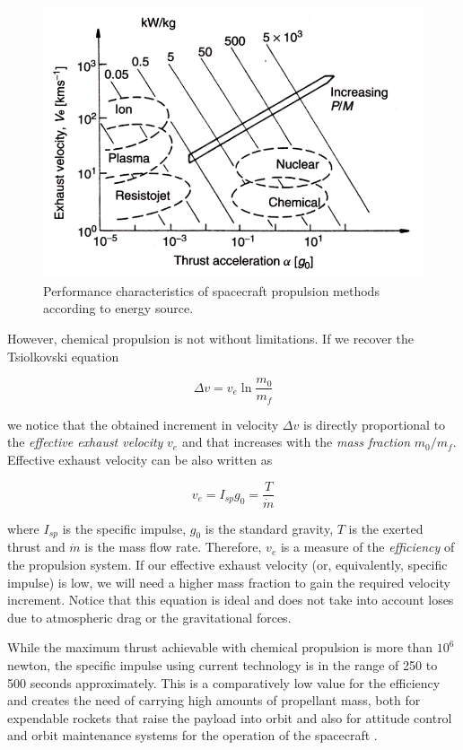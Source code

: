 \begin{figure}
\centering
\includegraphics[width=1.0\textwidth]{figures/propulsion-diagram.png}
\caption{Performance characteristics of spacecraft propulsion methods according to energy source.}
\label{fig:propulsionchart}
\end{figure}

However, chemical propulsion is not without limitations. If we recover the Tsiolkovski equation

\begin{equation}
\Delta v = v_e \ln \frac{m_0}{m_f}
\end{equation}

we notice that the obtained increment in velocity $\Delta v$ is directly proportional to the \textit{effective exhaust velocity} $v_e$ and that increases with the \textit{mass fraction} $m_0 / m_f$. Effective exhaust velocity can be also written as

\[
%
v_e = I_{sp} g_0 = \frac{T}{\dot{m}}
\]

where $I_{sp}$ is the specific impulse, $g_0$ is the standard gravity, $T$ is the exerted thrust and $\dot{m}$ is the mass flow rate. Therefore, $v_e$ is a measure of the \textit{efficiency} of the propulsion system. If our effective exhaust velocity (or, equivalently, specific impulse) is low, we will need a higher mass fraction to gain the required velocity increment. Notice that this equation is ideal and does not take into account loses due to atmospheric drag or the gravitational forces.

While the maximum thrust achievable with chemical propulsion is more than $10^6$ newton, the specific impulse using current technology is in the range of 250 to 500 seconds approximately. This is a comparatively low value for the efficiency and creates the need of carrying high amounts of propellant mass, both for expendable rockets that raise the payload into orbit and also for attitude control and orbit maintenance systems for the operation of the spacecraft \cite{curran1993nasa}.

